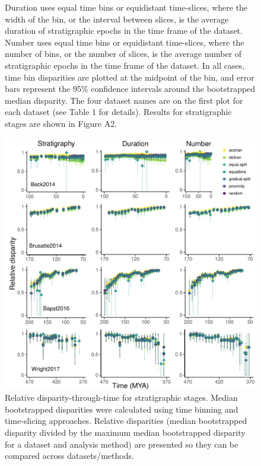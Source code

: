 \documentclass[12pt,a4paper]{article}
\begin{document}
\begin{figure}[!htbp]
{    Duration uses equal time bins or equidistant time-slices, where the width of the bin, or the interval between slices, is the average duration of stratigraphic epochs in the time frame of the dataset. 
    Number uses equal time bins or equidistant time-slices, where the number of bins, or the number of slices, is the average number of stratigraphic epochs in the time frame of the dataset. 
    In all cases, time bin disparities are plotted at the midpoint of the bin, and error bars represent the 95\% confidence intervals around the bootstrapped median disparity.
    The four dataset names are on the first plot for each dataset (see Table 1 for details).
    Results for stratigraphic stages are shown in Figure A2.}
    \label{figure:dtt2}
  \end{figure}  

  \begin{figure}[!htbp]
    \centering
    \includegraphics[width=1\linewidth, height=1\textheight, keepaspectratio]{figures/fig-dtt-age-appendix-revision.pdf}
    \caption[Relative disparity through time for four example datasets.]
    {Relative disparity-through-time for stratigraphic stages. 
    Median bootstrapped disparities were calculated using time binning and time-slicing approaches. 
    Relative disparities (median bootstrapped disparity divided by the maximum median bootstrapped disparity for a dataset and analysis method) are presented so they can be compared across datasets/methods. 
}
\end{figure}
\end{document}
